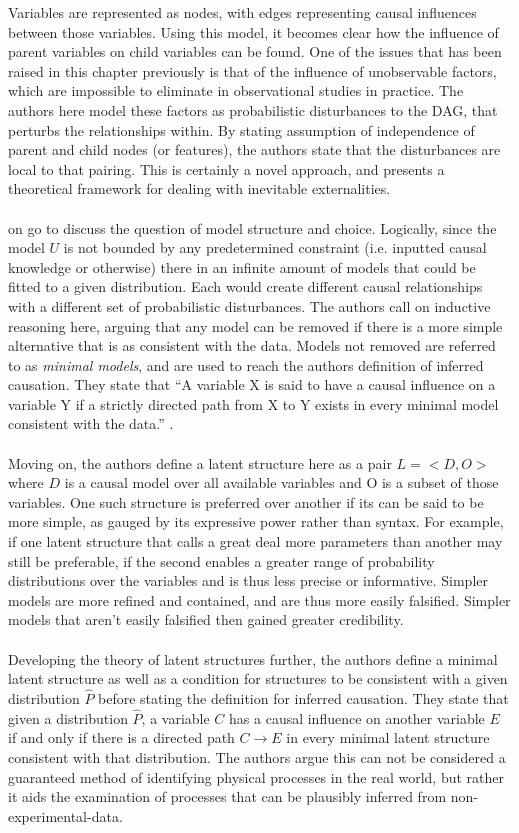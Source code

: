 {Variables are represented as nodes, with edges representing causal influences between those variables. Using this model, it becomes clear how the influence of parent variables on child variables can be found. One of the issues that has been raised in this chapter previously is that of the influence of unobservable factors, which are impossible to eliminate in observational studies in practice. The authors here model these factors as probabilistic disturbances to the DAG, that perturbs the relationships within. By stating assumption of independence of parent and child nodes (or features), the authors state that the disturbances are local to that pairing. This is certainly a novel approach, and presents a theoretical framework for dealing with inevitable externalities.\\\\
\cite {pearl1995theory} on go to discuss the question of model structure and choice. Logically, since the model $U$ is not bounded by any predetermined constraint (i.e. inputted causal knowledge or otherwise) there in an infinite amount of models that could be fitted to a given distribution. Each would create different causal relationships with a different set of probabilistic disturbances. The authors call on inductive reasoning here, arguing that any model can be removed if there is a more simple alternative that is as consistent with the data. Models not removed are referred to as {\it minimal models}, and are used to reach the authors definition of inferred causation. They state that
``A variable X is said to have a causal influence on a variable Y if a strictly directed path from X to Y exists in every minimal model consistent with the data.''   \cite {pearl1995theory}. \\\\
Moving on, the authors define a latent structure here as a pair $L = <D,O>$ where $D$ is a causal model over all available variables and O is a subset of those variables. One such structure is preferred over another if its can be said to be more simple, as gauged by its expressive power rather than syntax. For example, if one latent structure that calls a great deal more parameters than another may still be preferable, if the second enables a greater range of probability distributions over the variables and is thus less precise or informative. Simpler models are more refined and contained, and are thus more easily falsified. Simpler models that aren't easily falsified then gained greater credibility. \\\\
Developing the theory of latent structures further, the authors define a minimal latent structure as well as a condition for structures to be consistent with a given distribution $\hat{P}$ before stating the definition for inferred causation. They state that given a distribution $\hat{P}$, a variable $C$ has a causal influence on another variable $E$ if and only if there is a directed path $C \rightarrow E$ in every minimal latent structure consistent with that distribution. The authors argue this can not be considered a guaranteed method of identifying physical processes in the real world, but rather it aids the examination of processes that can be plausibly inferred from non-experimental-data.
}
